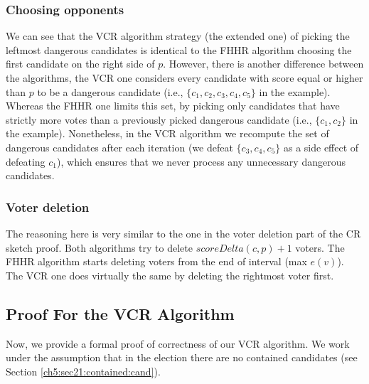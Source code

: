 \subsubsection{Choosing opponents}
We can see that the VCR algorithm strategy (the extended one) of
picking the leftmost dangerous candidates is identical to the FHHR algorithm choosing the first candidate on the right side of $p$.
However, there is another difference between the algorithms,
the VCR one considers every candidate with score equal or higher than $p$ to be a dangerous candidate
(i.e., $\{c_1, c_2, c_3, c_4, c_5\}$ in the example).
Whereas the FHHR one limits this set, by picking only candidates that have
strictly more votes than a previously picked dangerous candidate (i.e., $\{c_1, c_2\}$ in the example).
Nonetheless, in the VCR algorithm we recompute the set of dangerous candidates after each iteration
(we defeat $\{c_3, c_4, c_5\}$ as a side effect of defeating $c_1$),
which ensures that we never process any unnecessary dangerous candidates.

\subsubsection{Voter deletion}
The reasoning here is very similar to the one in the voter deletion part of the CR sketch proof.
Both algorithms try to delete $scoreDelta(c,p) + 1$ voters. 
The FHHR algorithm starts deleting voters from the end of interval (max $e(v)$).
The VCR one does virtually the same by deleting the rightmost voter first.

\subsection{Proof For the VCR Algorithm}
Now, we provide a formal proof of correctness of our VCR algorithm.
We work under the assumption that in the election there are no contained candidates (see Section \ref{ch5:sec21:contained:cand}).

